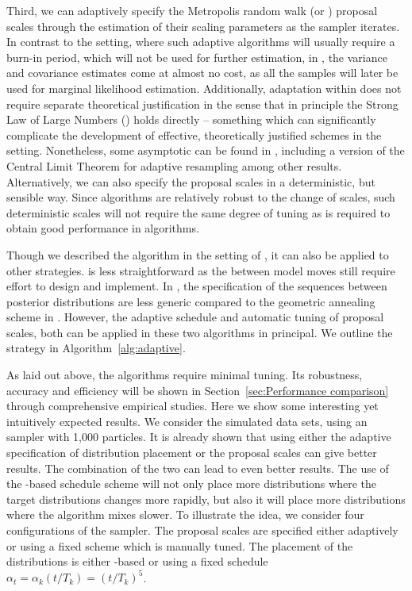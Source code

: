 Third, we can adaptively specify the Metropolis random walk (or \mala) proposal scales through the estimation of their scaling parameters as the sampler iterates. In contrast to the \mcmc setting, where such adaptive algorithms will usually require a burn-in period, which will not be used for further estimation, in \smc, the variance and covariance estimates come at almost no cost, as all the samples will later be used for marginal likelihood estimation. Additionally, adaptation within \smc does not require separate theoretical justification in the sense that in principle the Strong Law of Large Numbers (\slln) holds directly -- something which can significantly complicate the development of effective, theoretically justified schemes in the \mcmc setting. Nonetheless, some asymptotic can be found in \cite{Beskos:2013vx}, including a version of the Central Limit Theorem for adaptive resampling among other results. Alternatively, we can also specify the proposal scales in a deterministic, but sensible way. Since \smc algorithms are relatively robust to the change of scales, such deterministic scales will not require the same degree of tuning as is required to obtain good performance in \mcmc algorithms.

Though we described the algorithm in the setting of \smc[2], it can also be applied to other \smc strategies. \smc[1] is less straightforward as the between model moves still require effort to design and implement. In \smc[3], the specification of the sequences between posterior distributions are less generic compared to the geometric annealing scheme in \smc[2]. However, the adaptive schedule and automatic tuning of \mcmc proposal scales, both can be applied in these two algorithms in principal. We outline the strategy in Algorithm~\ref{alg:adaptive}.



As laid out above, the algorithms require minimal tuning. Its robustness, accuracy and efficiency will be shown in Section~\ref{sec:Performance comparison} through comprehensive empirical studies. Here we show some interesting yet intuitively expected results. We consider the simulated \pet data sets, using an \smc[2] sampler with 1,000 particles. It is already shown that using either the adaptive specification of distribution placement or the \mcmc proposal scales can give better results. The combination of the two can lead to even better results. The use of the \cess-based schedule scheme will not only place more distributions where the target distributions changes more rapidly, but also it will place more distributions where the \mcmc algorithm mixes slower. To illustrate the idea, we consider four configurations of the sampler. The proposal scales are specified either adaptively or using a fixed scheme which is manually tuned. The placement of the distributions is either \cess-based or using a fixed schedule $\alpha_t = \alpha_k(t/T_k) = (t/T_k)^5$.

